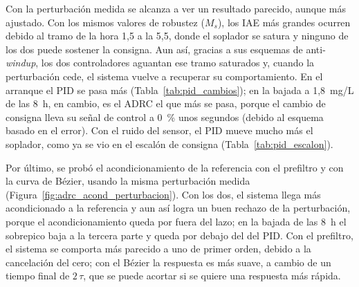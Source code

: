 \begin{table}[H]
\centering
\caption[Índices por cambio de consigna con la perturbación medida]{Índices
  de cada cambio de consigna con la perturbación medida, en una ventana de
  2~h desde el cambio. El IAE incluye el efecto de la perturbación en esa
  ventana.}
\label{tab:pid_cambios}
\renewcommand{\arraystretch}{1.3}
\end{table}


Con la perturbación medida se alcanza a ver un resultado parecido, aunque más ajustado. Con los
mismos valores de robustez ($M_s$), los IAE más grandes ocurren debido al tramo de la hora 1,5 a
la 5,5, donde el soplador se satura y ninguno de los dos puede sostener la consigna. Aun así, gracias
a sus esquemas de anti-\emph{windup}, los dos controladores aguantan ese tramo saturados y, cuando la
perturbación cede, el sistema vuelve a recuperar su comportamiento. En el arranque el PID se pasa más
(Tabla~\ref{tab:pid_cambios}); en la bajada a 1,8~mg/L de las 8~h, en cambio, es el ADRC el que más
se pasa, porque el cambio de consigna lleva su señal de control a 0~\% unos segundos (debido al esquema basado en el error). Con el ruido del sensor, el PID mueve mucho más el soplador, como ya se vio en el
escalón de consigna (Tabla~\ref{tab:pid_escalon}).

Por último, se probó el acondicionamiento de la referencia con el prefiltro y con la curva de Bézier,
usando la misma perturbación medida (Figura~\ref{fig:adrc_acond_perturbacion}). Con los dos, el
sistema llega más acondicionado a la referencia y aun así logra un buen rechazo de la perturbación,
porque el acondicionamiento queda por fuera del lazo; en la bajada de las 8~h el sobrepico baja a la
tercera parte y queda por debajo del del PID. Con el prefiltro, el sistema se comporta más
parecido a uno de primer orden, debido a la cancelación del cero; con el Bézier la respuesta es más
suave, a cambio de un tiempo final de $2\,\tau$, que se puede acortar si se quiere una respuesta más
rápida.


